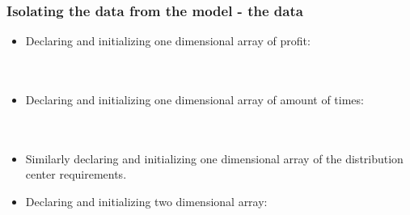 \documentclass[landscape]{beamer}
\begin{document}
 \begin{frame}
  \frametitle{Isolating  the data from the model - the data} 
\begin{footnotesize}  
\begin{itemize}
\item Declaring and initializing one dimensional array of profit:\\
         \texttt{}\\
         \texttt{}\\
\item  Declaring and initializing one dimensional array of amount of times:\\
           \texttt{}\\
            \texttt{}\\
\item  Similarly declaring and initializing    one dimensional array of the distribution center requirements.
\item   Declaring and initializing     two dimensional array:\\
           \texttt{}\\
\end{itemize}  
\end{footnotesize}
\end{frame}  
\end{document}
